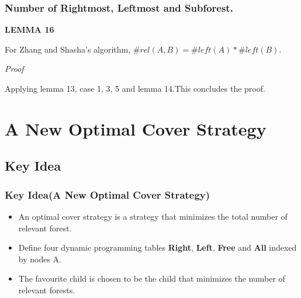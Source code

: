 \documentclass{beamer}
\begin{document}

\begin{frame}
\frametitle{Number of Rightmost, Leftmost and Subforest.}
\textbf{LEMMA 16}

For Zhang and Shasha's algorithm, $\#rel(A, B) = \#left(A) * \#left(B)$.

\vspace{12pt} 
\emph{Proof}

Applying lemma 13, case 1, 3, 5 and lemma 14.This concludes the proof.
\end{frame}



\section{A New Optimal Cover Strategy}
\subsection{Key Idea}
\begin{frame}
\frametitle{Key Idea(A New Optimal Cover Strategy)}
\begin{itemize}
\item An optimal cover strategy is a strategy that minimizes the total number of relevant forest.
\item Define four dynamic programming tables \textbf{Right}, \textbf{Left}, \textbf{Free} and \textbf{All} indexed by nodes A.
\item The favourite child is chosen to be the child that minimizes the number of relevant forests.
\end{itemize}

\end{frame}

\end{document}

